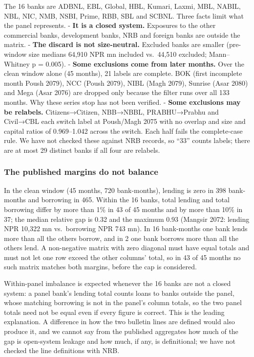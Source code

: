 \documentclass[
  a4paper,
]{article}
\begin{document}
The 16 banks are ADBNL, EBL, Global, HBL, Kumari, Laxmi, MBL, NABIL,
NBL, NIC, NMB, NSBI, Prime, RBB, SBL and SCBNL. Three facts limit what
the panel represents. - \textbf{It is a closed system.} Exposures to the
other commercial banks, development banks, NRB and foreign banks are
outside the matrix. - \textbf{The discard is not size-neutral.} Excluded
banks are smaller (pre-window size medians 64,910 NPR mn included
vs.~44,510 excluded; Mann--Whitney p = 0.005). - \textbf{Some exclusions
come from later months.} Over the clean window alone (45 months), 21
labels are complete. BOK (first incomplete month Poush 2079), NCC (Poush
2079), NIBL (Magh 2079), Sunrise (Asar 2080) and Mega (Asar 2076) are
dropped only because the filter runs over all 133 months. Why these
series stop has not been verified. - \textbf{Some exclusions may be
relabels.} Citizens→Citizen, NBB→NBBL, PRABHU→Prabhu and Civil→CBL each
switch label at Poush/Magh 2075 with no overlap and size and capital
ratios of 0.969--1.042 across the switch. Each half fails the
complete-case rule. We have not checked these against NRB records, so
``33'' counts labels; there are at most 29 distinct banks if all four
are relabels.

\subsubsection*{The published margins do not
balance}\label{the-published-margins-do-not-balance}

In the clean window (45 months, 720 bank-months), lending is zero in 398
bank-months and borrowing in 465. Within the 16 banks, total lending and
total borrowing differ by more than 1\% in 43 of 45 months and by more
than 10\% in 37; the median relative gap is 0.32 and the maximum 0.93
(Mangsir 2072: lending NPR 10,322 mn vs.~borrowing NPR 743 mn). In 16
bank-months one bank lends more than all the others borrow, and in 2 one
bank borrows more than all the others lend. A non-negative matrix with
zero diagonal must have equal totals and must not let one row exceed the
other columns' total, so in 43 of 45 months no such matrix matches both
margins, before the cap is considered.

Within-panel imbalance is expected whenever the 16 banks are not a
closed system: a panel bank's lending total counts loans to banks
outside the panel, whose matching borrowing is not in the panel's column
totals, so the two panel totals need not be equal even if every figure
is correct. This is the leading explanation. A difference in how the two
bulletin lines are defined would also produce it, and we cannot say from
the published aggregates how much of the gap is open-system leakage and
how much, if any, is definitional; we have not checked the line
definitions with NRB.
\end{document}
